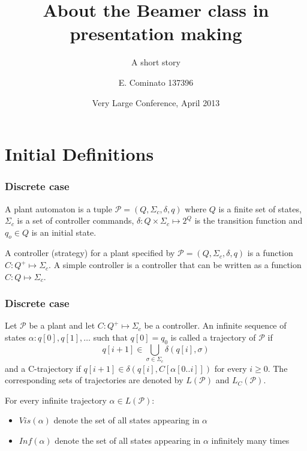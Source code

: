 \documentclass[table]{beamer}
\title[About Beamer] %
{About the Beamer class in presentation making}
\subtitle{A short story}
\author[Enrico] %
{E. Cominato 137396\inst{1}}
\institute %
{
	\inst{1}%
	Dipartimento di Scienze Matematiche, Informatiche e Fisiche\\
	Università degli studi di Udine
}
\date[VLC 2013] %
{Very Large Conference, April 2013}
\begin{document}
\frame{\titlepage}

\section{Initial Definitions}
\newcommand{\Plant}{\ensuremath{\mathcal{P}=(Q,\Sigma_c,\delta, q)}}
\newcommand{\Controller}{\ensuremath{C:Q^+\longmapsto \Sigma_c}}
\newcommand{\AccpCond}{\ensuremath{\{(F,\Diamond),(F,\square ),(F,\Diamond\square),(F,\square\Diamond),(\mathcal{F},\mathcal{R}_n)\}}}
\newcommand{\Synth}{\ensuremath{\textbf{Synth}(\mathcal{P},\Omega)}}
\begin{frame}
	\frametitle{Discrete case}
	\begin{dfn}[Plant]
		A plant automaton is a tuple $\Plant$ where
		$Q$ is a finite set of states, $\Sigma_c$ is a set of controller commands, 
		$\delta:Q \times \Sigma_c \longmapsto 2^Q$ is the transition function and 
		$q_o \in Q$ is an initial state.
	\end{dfn}

	\begin{dfn}[Controllers]
		A controller (strategy) for a plant specified by $\Plant$ 
		is a function $\Controller$. A simple controller is a controller that 
		can be written as a function $C:Q \longmapsto \Sigma_c$.
	\end{dfn}
\end{frame}

\begin{frame}
	\frametitle{Discrete case}
	\begin{dfn}[Trajectories]
		Let $\mathcal{P}$ be a plant and let $\Controller$ be a controller. 
		An infinite sequence of states $\alpha:q[0],q[1],\ldots$ such that
		 $q[0]=q_0$ is called a trajectory of $\mathcal{P}$ if 
		$$q[i+1] \in \bigcup_{\sigma \in \Sigma_c}\delta(q[i],\sigma)$$
		and a C-trajectory if $q[i+1] \in \delta(q[i],C[\alpha[0..i]])$ for every $i\geq 0$.
		The corresponding sets of trajectories are denoted by $L(\mathcal{P})$ and $L_C(\mathcal{P})$.
	\end{dfn}
\end{frame}

\begin{frame}
	For every infinite trajectory $\alpha \in L(\mathcal{P})$:
	\begin{itemize}
		\item $Vis(\alpha)$ denote the set of all states appearing in $\alpha$
		\item $Inf(\alpha)$ denote the set of all states appearing in $\alpha$ infinitely many times
	\end{itemize}
\end{frame}
\end{document}
